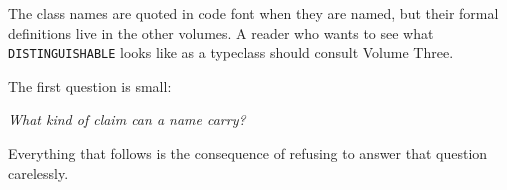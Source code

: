 The class names are quoted in code font when they are named, but their
formal definitions live in the other volumes. A reader who wants to see
what \texttt{DISTINGUISHABLE} looks like as a typeclass should consult
Volume Three.

The first question is small:

\begin{center}
\emph{What kind of claim can a name carry?}
\end{center}

Everything that follows is the consequence of refusing to answer that
question carelessly.
